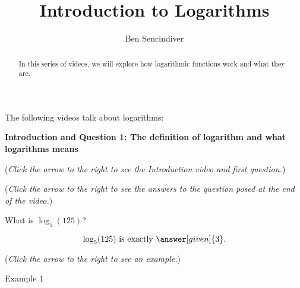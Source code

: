 \documentclass{ximera}
\title[Prerequisite Videos: ]{Introduction to Logarithms}
\author{Ben Sencindiver}
\begin{document}
\begin{abstract}
  In this series of videos, we will explore how logarithmic functions
  work and what they are.
\end{abstract}
\maketitle

The following videos talk about logarithms: 

\textbf{Introduction and Question 1: The definition of logarithm and what
logarithms means}
\begin{question}
\begin{flushright}
{\color{blue}(\emph{Click the arrow to the right to see the Introduction video and first question.})}
\end{flushright}
\begin{center}
\begin{expandable}
{\color{blue}(\emph{Click the arrow to the right to see the answers 
to the question posed at the end of the video.})}
\begin{expandable}
What is $\log_5(125)$?
\begin{prompt}
\[
\log_5(125) \text{ is exactly }\answer[given]{3}.
\]
\end{prompt}
\begin{flushright}
{\color{blue}(\emph{Click the arrow to the right to see an example.})}
\end{flushright}
\begin{expandable}
Example 1
\end{expandable}
\end{expandable}
\end{expandable}
\end{center}
\end{question}
\end{document}
